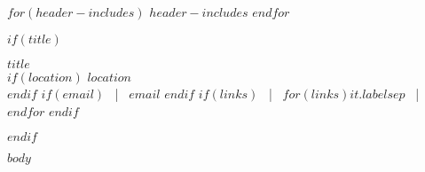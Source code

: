 \documentclass[11pt,a4paper]{article}
\begin{document}
$for(header-includes)$
$header-includes$
$endfor$

$if(title)$
\begin{center}
    {\Huge \textbf{\textcolor{mypurple}{$title$}}} \\[1mm]
    $if(location)$
        $location$\\[1mm]
    $endif$
    $if(email)$
        \, | \, \href{mailto:$email$}{$email$}%
    $endif$
    $if(links)$
        \, | \, $for(links)$\href{$it.url$}{\textcolor{myblue}{$it.label$}}$sep$ \, | \, $endfor$
    $endif$ \\[2mm]
\end{center}
$endif$

$body$
\end{document}
